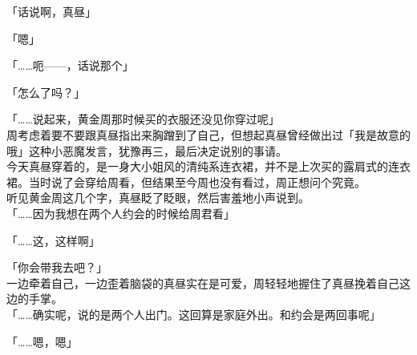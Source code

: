「话说啊，真昼」

「嗯」

「……呃——，话说那个」

「怎么了吗？」

「……说起来，黄金周那时候买的衣服还没见你穿过呢」\\

周考虑着要不要跟真昼指出来胸蹭到了自己，但想起真昼曾经做出过「我是故意的哦」这种小恶魔发言，犹豫再三，最后决定说别的事请。\\

今天真昼穿着的，是一身大小姐风的清纯系连衣裙，并不是上次买的露肩式的连衣裙。当时说了会穿给周看，但结果至今周也没有看过，周正想问个究竟。\\

听见黄金周这几个字，真昼眨了眨眼，然后害羞地小声说到。\\

「……因为我想在两个人约会的时候给周君看」

「……这，这样啊」

「你会带我去吧？」\\

一边牵着自己，一边歪着脑袋的真昼实在是可爱，周轻轻地握住了真昼挽着自己这边的手掌。\\

「……确实呢，说的是两个人出门。这回算是家庭外出。和约会是两回事呢」

「……嗯，嗯」

